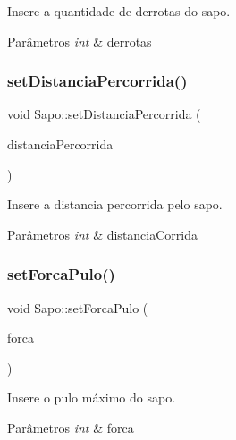 Insere a quantidade de derrotas do sapo. 


\begin{DoxyParams}{Parâmetros}
{\em int} & derrotas \\
\hline
\end{DoxyParams}
\mbox{\label{classSapo_add67eaff380b20f5601e7a9779468fd8}} 
\subsubsection{\texorpdfstring{set\+Distancia\+Percorrida()}{setDistanciaPercorrida()}}
{\footnotesize\ttfamily void Sapo\+::set\+Distancia\+Percorrida (\begin{DoxyParamCaption}\item[{int}]{distancia\+Percorrida }\end{DoxyParamCaption})}



Insere a distancia percorrida pelo sapo. 


\begin{DoxyParams}{Parâmetros}
{\em int} & distancia\+Corrida \\
\hline
\end{DoxyParams}
\mbox{\label{classSapo_ab43f2991360d34d24f73d4cf0e7e9ea6}} 
\subsubsection{\texorpdfstring{set\+Forca\+Pulo()}{setForcaPulo()}}
{\footnotesize\ttfamily void Sapo\+::set\+Forca\+Pulo (\begin{DoxyParamCaption}\item[{int}]{forca }\end{DoxyParamCaption})}



Insere o pulo máximo do sapo. 


\begin{DoxyParams}{Parâmetros}
{\em int} & forca \\
\hline
\end{DoxyParams}
\mbox{\label{classSapo_a617cde091fd409e66caacee5bf079e05}} 
